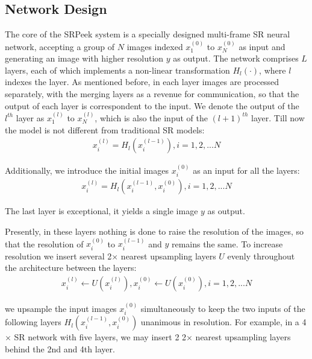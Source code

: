 \subsection{Network Design}
The core of the \textsf{SRPeek} system is a specially designed multi-frame SR neural network, accepting a group of $N$ images indexed $x_1^{(0)}$ to $x_N^{(0)}$ as input and generating an image with higher resolution $y$ as output. The network comprises $L$ layers, each of which implements a non-linear transformation $H_l(\cdot)$, where $l$ indexes the layer. As mentioned before, in each layer images are processed separately, with the merging layers as a revenue for communication, so that the output of each layer is correspondent to the input.  We denote the output of the $l^{th}$ layer as $x_1^{(l)}$ to $x_N^{(l)}$, which is also the input of the $(l+1)^{th}$ layer. Till now the model is not different from traditional SR models:
\begin{equation}\label{eq:1}
    \begin{split}
x_i^{(l)} = H_l(x_i^{(l-1)}), i=1,2,...N
\end{split}
\end{equation}


Additionally, we introduce the initial images $x_i^{(0)}$ as an input for all the layers:
\begin{equation}\label{eq:2}
    \begin{split}
        x_i^{(l)} = H_l(x_i^{(l-1)},x_i^{(0)}), i=1,2,...N
\end{split}
\end{equation}

The last layer is exceptional, it yields a single image $y$ as output. 

Presently, in these layers nothing is done to raise the resolution of the images, so that the resolution of $x_i^{(0)}$ to $x_i^{(l-1)}$ and $y$ remains the same. To increase resolution we insert several 2$\times$ nearest upsampling layers $U$ evenly throughout the architecture between the layers:
\begin{equation}\label{eq:3}
    \begin{split}
        x_i^{(l)} \leftarrow U(x_i^{(l)}), x_i^{(0)} \leftarrow U(x_i^{(0)}), i=1,2,...N
\end{split}
\end{equation}

we upsample the input images $x_i^{(0)}$ simultaneously to keep the two inputs of the following layers $H_l(x_i^{(l-1)},x_i^{(0)})$ unanimous in resolution. For example, in a 4$\times$ SR network with five layers, we may insert 2 2$\times$ nearest upsampling layers behind the 2nd and 4th layer.

